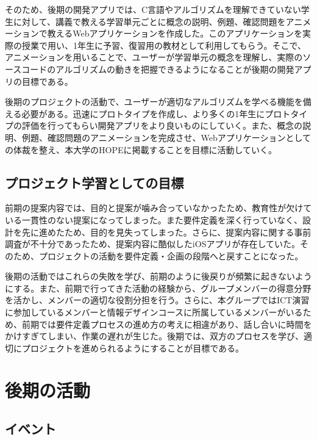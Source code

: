 \documentclass[openany,11pt,papersize]{jsbook}
\begin{document}
\par
そのため、後期の開発アプリでは、C言語やアルゴリズムを理解できていない学生に対して、講義で教える学習単元ごとに概念の説明、例題、確認問題をアニメーションで教えるWebアプリケーションを作成した。このアプリケーションを実際の授業で用い、1年生に予習、復習用の教材として利用してもらう。そこで、アニメーションを用いることで、ユーザーが学習単元の概念を理解し、実際のソースコードのアルゴリズムの動きを把握できるようになることが後期の開発アプリの目標である。
\par
後期のプロジェクトの活動で、ユーザーが適切なアルゴリズムを学べる機能を備える必要がある。迅速にプロトタイプを作成し、より多くの1年生にプロトタイプの評価を行ってもらい開発アプリをより良いものにしていく。また、概念の説明、例題、確認問題のアニメーションを完成させ、Webアプリケーションとしての体裁を整え、本大学のHOPEに掲載することを目標に活動していく。

\section{プロジェクト学習としての目標}
前期の提案内容では、目的と提案が噛み合っていなかったため、教育性が欠けている一貫性のない提案になってしまった。また要件定義を深く行っていなく、設計を先に進めたため、目的を見失ってしまった。さらに、提案内容に関する事前調査が不十分であったため、提案内容に酷似したiOSアプリが存在していた。そのため、プロジェクトの活動を要件定義・企画の段階へと戻すことになった。
\par
後期の活動ではこれらの失敗を学び、前期のように後戻りが頻繁に起きないようにする。また、前期で行ってきた活動の経験から、グループメンバーの得意分野を活かし、メンバーの適切な役割分担を行う。さらに、本グループではICT演習に参加しているメンバーと情報デザインコースに所属しているメンバーがいるため、前期では要件定義プロセスの進め方の考えに相違があり、話し合いに時間をかけすぎてしまい、作業の遅れが生じた。後期では、双方のプロセスを学び、適切にプロジェクトを進められるようにすることが目標である。



\chapter{後期の活動}


\section{イベント}
\end{document}
